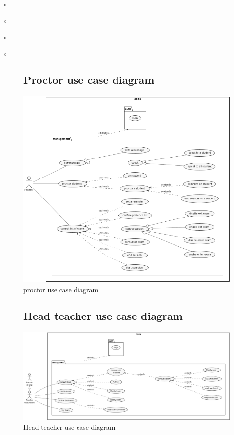 \documentclass[]{uc2pfecaneva}
\begin{document}
\begin{list}{$\circ$}{}
\begin{list}{$\circ$}{}
\begin{list}{$\circ$}{}
\begin{list}{$\circ$}{}
\begin{figure}
        \subsection{Proctor use case diagram}
        \centering
        \includegraphics[width=\textwidth]{images/proctor_UCD}
        \caption{proctor use case diagram}
    \end{figure}


    \begin{figure}
        \subsection{Head teacher use case diagram}
        \centering
        \includegraphics[width=450pt]{images/Module_Teacher}
        \caption{Head teacher use case diagram}
    \end{figure}


\end{list}
\end{list}
\end{list}
\end{list}
\end{document}
